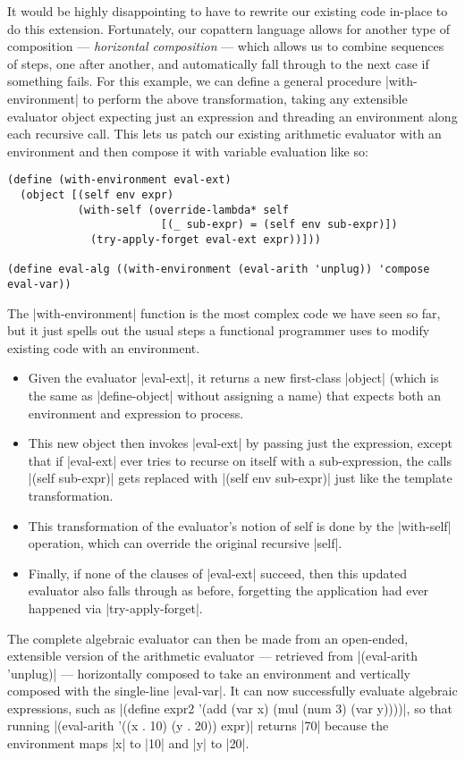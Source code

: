 It would be highly disappointing to have to rewrite our existing code in-place to do this extension.
Fortunately, our copattern language allows for another type of composition --- \emph{horizontal composition} --- which allows us to combine sequences of steps, one after another, and automatically fall through to the next case if something fails.
For this example, we can define a general procedure \scm|with-environment| to perform the above transformation, taking any extensible evaluator object expecting just an expression and threading an environment along each recursive call.
This lets us patch our existing arithmetic evaluator with an environment and then compose it with variable evaluation like so:
\begin{verbatim}
(define (with-environment eval-ext)
  (object [(self env expr)
           (with-self (override-lambda* self
                        [(_ sub-expr) = (self env sub-expr)])
             (try-apply-forget eval-ext expr))]))

(define eval-alg ((with-environment (eval-arith 'unplug)) 'compose eval-var))
\end{verbatim}
The \scm|with-environment| function is the most complex code we have seen so far, but it just spells out the usual steps a functional programmer uses to modify existing code with an environment.
\begin{itemize}
\item Given the evaluator \scm|eval-ext|, it returns a new first-class \scm|object| (which is the same as \scm|define-object| without assigning a name) that expects both an environment and expression to process.
\item This new object then invokes \scm|eval-ext| by passing just the expression, except that if \scm|eval-ext| ever tries to recurse on itself with a sub-expression, the calls \scm|(self sub-expr)| gets replaced with \scm|(self env sub-expr)| just like the template transformation.
\item This transformation of the evaluator's notion of self is done by the \scm|with-self| operation, which can override the original recursive \scm|self|.
\item Finally, if none of the clauses of \scm|eval-ext| succeed, then this updated evaluator also falls through as before, forgetting the application had ever happened via \scm|try-apply-forget|.
\end{itemize}
The complete algebraic evaluator can then be made from an open-ended, extensible version of the arithmetic evaluator --- retrieved from \scm|(eval-arith 'unplug)| --- horizontally composed to take an environment and vertically composed with the single-line \scm|eval-var|.
It can now successfully evaluate algebraic expressions, such as \scm|(define expr2 '(add (var x) (mul (num 3) (var y))))|, so that running \scm|(eval-arith '((x . 10) (y . 20)) expr)| returns \scm|70| because the environment maps \scm|x| to \scm|10| and \scm|y| to \scm|20|.

